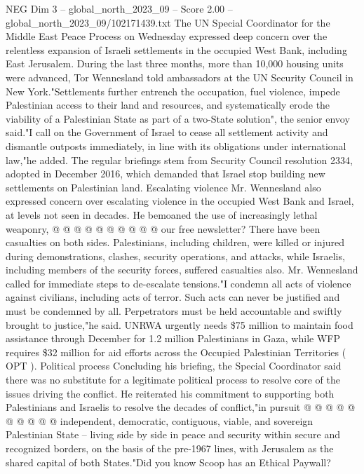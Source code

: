 \begin{textsample}{NEG Dim 3 – global\_north\_2023\_09 – Score 2.00 – global\_north\_2023\_09/102171439.txt}  \label{ex:f3_neg_396}
The UN Special Coordinator for the Middle East Peace Process on Wednesday expressed deep concern over the relentless expansion of Israeli settlements in the occupied West Bank, including East Jerusalem.
During the last three months, more than 10,000 housing units were advanced, Tor Wennesland told ambassadors at the UN Security Council in New York."Settlements further entrench the occupation, fuel violence, impede Palestinian access to their land and resources, and systematically erode the viability of a Palestinian State as part of a two-State solution", the senior envoy said."I call on the Government of Israel to cease all settlement activity and dismantle outposts immediately, in line with its obligations under international law,"he added.
The regular briefings stem from Security Council resolution 2334, adopted in December 2016, which demanded that Israel stop building new settlements on Palestinian land.
Escalating violence Mr.
Wennesland also expressed concern over escalating violence in the occupied West Bank and Israel, at levels not seen in decades.
He bemoaned the use of increasingly lethal weaponry, @ @ @ @ @ @ @ @ @ @ our free newsletter?
There have been casualties on both sides.
Palestinians, including children, were killed or injured during demonstrations, clashes, security operations, and attacks, while Israelis, including members of the security forces, suffered casualties also.
Mr.
Wennesland called for immediate steps to de-escalate tensions."I condemn all acts of violence against civilians, including acts of terror.
Such acts can never be justified and must be condemned by all.
Perpetrators must be held accountable and swiftly brought to justice,"he said.
UNRWA urgently needs \$75 million to maintain food assistance through December for 1.2 million Palestinians in Gaza, while WFP requires \$32 million for aid efforts across the Occupied Palestinian Territories ( OPT ).
Political process Concluding his briefing, the Special Coordinator said there was no substitute for a legitimate political process to resolve core of the issues driving the conflict.
He reiterated his commitment to supporting both Palestinians and Israelis to resolve the decades of conflict,"in pursuit @ @ @ @ @ @ @ @ @ @ independent, democratic, contiguous, viable, and sovereign Palestinian State -- living side by side in peace and security within secure and recognized borders, on the basis of the pre-1967 lines, with Jerusalem as the shared capital of both States."Did you know Scoop has an Ethical Paywall?

\end{textsample}
